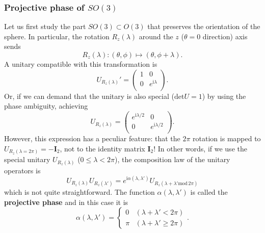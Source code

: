 \documentclass[
]{scrartcl}
\numberwithin{equation}{section}
\theoremstyle{definition}
\theoremstyle{definition}
\theoremstyle{definition}
\theoremstyle{definition}
\theoremstyle{remark}
\begin{document}
\hypertarget{projective-phase-of-so3}{%
\subsubsection{\texorpdfstring{Projective phase of \(SO(3)\)}{Projective phase of SO(3)}}\label{projective-phase-of-so3}}

Let us first study the part \(SO(3) \subset O(3)\) that preserves the orientation of the sphere.
In particular, the rotation \(R_z(\lambda)\) around the \(z\) (\(\theta =0\) direction) axis sends
\begin{equation}
  \label{eq:Rz}
  R_z(\lambda) : (\theta ,\phi) \mapsto (\theta, \phi + \lambda).
\end{equation}
A unitary compatible with this transformation is
\begin{equation}
  \label{eq:RzU1}
  U_{R_z(\lambda)}' = 
  \begin{pmatrix}
  1 & 0 \\
  0 & e^{\mathrm{i}\lambda}\\
  \end{pmatrix}.
\end{equation}
Or, if we can demand that the unitary is also special (\(\mathrm{det}U =1\)) by using the phase ambiguity,
achieving
\begin{equation}
  \label{eq:RzU2}
  U_{R_z(\lambda)} = 
  \begin{pmatrix}
  e^{\mathrm{i}\lambda/2} & 0 \\
  0 & e^{\mathrm{i}\lambda/2}\\
  \end{pmatrix}.
\end{equation}
However, this expression has a peculiar feature:
that the \(2\pi\) rotation is mapped to \(U_{R_z(\lambda = 2\pi)} = -\mathbf{I}_{2}\), not to the identity matrix \(\mathbf{I}_2\)!
In other words, if we use the special unitary \(U_{R_z(\lambda)}\) (\(0\le \lambda < 2\pi\)), the composition law of the unitary operators is
\begin{equation}
  \label{eq:UUprod}
  U_{R_z(\lambda)} U_{R_z(\lambda')} = e^{\mathrm{i}\alpha(\lambda,\lambda')}U_{R_z(\lambda+\lambda' \mathrm{mod}\, 2\pi)}
\end{equation}
which is not quite straightforward. The function \(\alpha(\lambda,\lambda')\) is called the \textbf{projective phase} and in this case it is
\begin{equation}
  \label{eq:projphaseRz}
  \alpha(\lambda,\lambda')=
    \begin{cases}
      0 & (\lambda+\lambda' < 2\pi)\\
      \pi & (\lambda+\lambda' \ge 2\pi)
    \end{cases}.
\end{equation}
\end{document}
